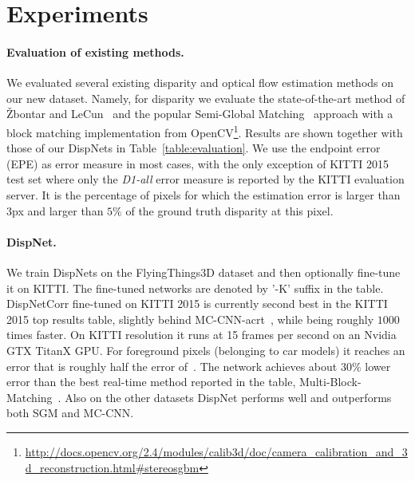 \documentclass[10pt,twocolumn,letterpaper]{article}
\begin{document}
\section{Experiments}\label{sec:experiments}
\paragraph{Evaluation of existing methods.}
We evaluated several existing disparity and optical flow estimation methods on our new dataset.
Namely, for disparity we evaluate the state-of-the-art method of {\v{Z}}bontar and 
LeCun~\cite{zbontar2015stereo} and the popular Semi-Global Matching~\cite{Hirschmueller2008PAMI} 
approach with a block matching implementation from OpenCV\footnote{\url{http://docs.opencv.org/2.4/modules/calib3d/doc/camera_calibration_and_3d_reconstruction.html\#stereosgbm}}.
Results are shown together with those of our DispNets in Table~\ref{table:evaluation}.
We use the endpoint error (EPE) as error measure in most cases, with the only exception of KITTI 2015 test set where only the \emph{D1-all} error measure is reported by the KITTI evaluation server.
It is the percentage of pixels for which the estimation error is larger than $3$px and larger than $5 \%$ of the ground truth disparity at this pixel.

\paragraph{DispNet.}
We train DispNets on the FlyingThings3D dataset and then optionally fine-tune it on KITTI.
The fine-tuned networks are denoted by '-K' suffix in the table.
DispNetCorr fine-tuned on KITTI 2015 is currently second best in the KITTI 2015 top results table, slightly behind MC-CNN-acrt~\cite{zbontar2015stereo}, while being roughly $1000$ times faster. On KITTI resolution it runs at 15 frames per second on an Nvidia GTX TitanX GPU. 
For foreground pixels (belonging to car models) it reaches an error that is roughly half the error of~\cite{zbontar2015stereo}.
The network achieves about $30 \%$ lower error than the best real-time method reported in the table, Multi-Block-Matching~\cite{EineckeE15}.
Also on the other datasets DispNet performs well and outperforms both SGM and MC-CNN. 
\end{document}
